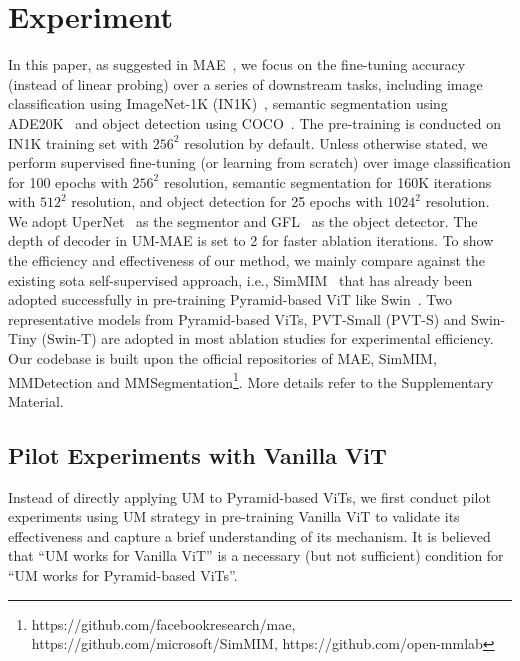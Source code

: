 \documentclass{article}
\begin{document}
\section{Experiment}
In this paper, as suggested in MAE~\cite{he2021masked}, we focus on the fine-tuning accuracy (instead of linear probing) over a series of downstream tasks, including image classification using ImageNet-1K (IN1K)~\cite{deng2009imagenet}, semantic segmentation using ADE20K~\cite{zhou2017scene} and object detection using COCO~\cite{lin2014microsoft}. The pre-training is conducted on IN1K training set with $256^2$ resolution by default. Unless otherwise stated, we perform supervised fine-tuning (or learning from scratch) over image classification for 100 epochs with $256^2$ resolution, semantic segmentation for 160K iterations with $512^2$ resolution, and object detection for 25 epochs with $1024^2$ resolution. We adopt UperNet~\cite{xiao2018unified} as the segmentor and GFL~\cite{li2020generalized} as the object detector. The depth of decoder in UM-MAE is set to 2 for faster ablation iterations. 
To show the efficiency and effectiveness of our method, we mainly compare against the existing sota self-supervised approach, i.e., SimMIM~\cite{xie2021simmim} that has already been adopted successfully in pre-training Pyramid-based ViT like Swin~\cite{liu2021swin,liu2021swinv2}. Two representative models from Pyramid-based ViTs, PVT-Small (PVT-S) and Swin-Tiny (Swin-T) are adopted in most ablation studies for experimental efficiency. Our 
codebase is built upon the official repositories of MAE, SimMIM, MMDetection and MMSegmentation\footnote{\scriptsize https://github.com/facebookresearch/mae, https://github.com/microsoft/SimMIM, https://github.com/open-mmlab}. More details refer to the Supplementary Material.



\subsection{Pilot Experiments with Vanilla ViT}
Instead of directly applying UM to Pyramid-based ViTs, we first conduct pilot experiments using UM strategy in pre-training Vanilla ViT to validate its effectiveness and capture a brief understanding of its mechanism. It is believed that ``UM works for Vanilla ViT'' is a necessary (but not sufficient) condition for ``UM works for Pyramid-based ViTs''. 
\end{document}
